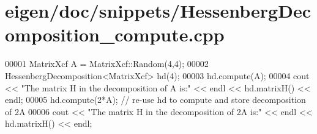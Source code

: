 \hypertarget{eigen_2doc_2snippets_2_hessenberg_decomposition__compute_8cpp_source}{}\section{eigen/doc/snippets/\+Hessenberg\+Decomposition\+\_\+compute.cpp}
\label{eigen_2doc_2snippets_2_hessenberg_decomposition__compute_8cpp_source}

\begin{DoxyCode}
00001 MatrixXcf A = MatrixXcf::Random(4,4);
00002 HessenbergDecomposition<MatrixXcf> hd(4);
00003 hd.compute(A);
00004 cout << \textcolor{stringliteral}{"The matrix H in the decomposition of A is:"} << endl << hd.matrixH() << endl;
00005 hd.compute(2*A); \textcolor{comment}{// re-use hd to compute and store decomposition of 2A}
00006 cout << \textcolor{stringliteral}{"The matrix H in the decomposition of 2A is:"} << endl << hd.matrixH() << endl;
\end{DoxyCode}
